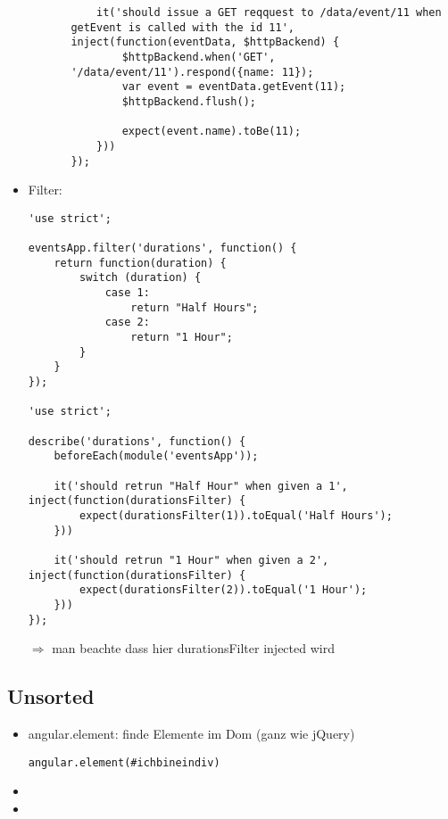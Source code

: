 \begin{itemize}
\begin{itemize}
\begin{itemize}
\begin{verbatim}
    it('should issue a GET reqquest to /data/event/11 when getEvent is called with the id 11', inject(function(eventData, $httpBackend) {
        $httpBackend.when('GET', '/data/event/11').respond({name: 11});
        var event = eventData.getEvent(11);
        $httpBackend.flush();

        expect(event.name).toBe(11);
    }))
});
            \end{verbatim}
        \end{itemize}
    \end{itemize}
  \item Filter:
    \begin{verbatim}
'use strict';

eventsApp.filter('durations', function() {
    return function(duration) {
        switch (duration) {
            case 1:
                return "Half Hours";
            case 2:
                return "1 Hour";
        }
    }
});

'use strict';

describe('durations', function() {
    beforeEach(module('eventsApp'));

    it('should retrun "Half Hour" when given a 1', inject(function(durationsFilter) {
        expect(durationsFilter(1)).toEqual('Half Hours');
    }))

    it('should retrun "1 Hour" when given a 2', inject(function(durationsFilter) {
        expect(durationsFilter(2)).toEqual('1 Hour');
    }))
});
    \end{verbatim}
	$\Rightarrow$  man beachte dass hier durationsFilter injected wird

\end{itemize}


\subsection{Unsorted}
\begin{itemize}
  \item angular.element: finde Elemente im Dom (ganz wie jQuery)
    \begin{verbatim}
angular.element(#ichbineindiv)
    \end{verbatim}
  \item
  \item
\end{itemize}




